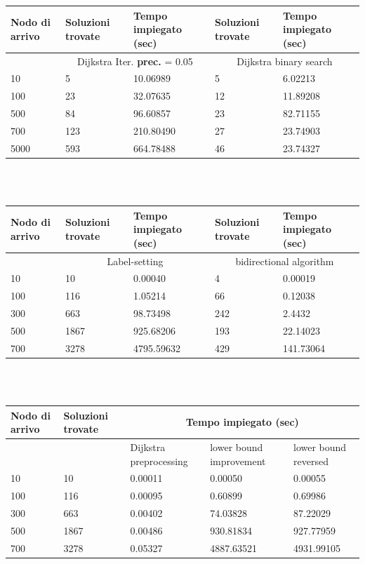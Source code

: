 \documentclass[a4paper,11pt]{report}
\begin{document}
\begin{table}[H]
	\begin{tabular}{ |p{2cm}||p{2cm}|p{3cm}|p{2cm}|p{3cm}|  }
		\hline
		Nodo di arrivo & Soluzioni trovate & Tempo impiegato (sec) & Soluzioni trovate & Tempo impiegato (sec) \\
		\hline
		& \multicolumn{2}{|c|}{Dijkstra Iter. \textbf{prec.} = 0.05} &
		\multicolumn{2}{|c|}{Dijkstra binary search} \\
		\hline
		
		10 & 5 & 10.06989 & 5 & 6.02213\\
		100 & 23 & 32.07635  & 12 & 11.89208\\
		500 & 84 & 96.60857 & 23 & 82.71155\\
		700 & 123 & 210.80490 & 27 & 23.74903\\
		5000 & 593 & 664.78488 & 46 & 23.74327\\	
		\hline
		
	\end{tabular}
	\\
	\\
	
	\begin{tabular}{ |p{2cm}||p{2cm}|p{3cm}|p{2cm}|p{3cm}|  }
		\hline
		Nodo di arrivo & Soluzioni trovate & Tempo impiegato (sec) & Soluzioni trovate & Tempo impiegato (sec) \\
		\hline
		&\multicolumn{2}{|c|}{Label-setting} &  \multicolumn{2}{|c|}{bidirectional algorithm} \\
		\hline
		10 & 10 & 0.00040 & 4 & 0.00019 \\
		100  & 116 & 1.05214 & 66 & 0.12038 \\
		300  & 663 & 98.73498 & 242 & 2.4432 \\
		500 & 1867 & 925.68206 & 193 & 22.14023 \\
		700 & 3278 & 4795.59632 & 429 & 141.73064\\
		
		\hline
		
	\end{tabular}
	\\
	\\
	
	\begin{tabular}{ |p{2cm}||p{2cm}|p{2.5cm}|p{3cm}|p{2.5cm}|  }
		\hline
		Nodo di arrivo & Soluzioni trovate & \multicolumn{3}{|c|}{Tempo impiegato (sec)} \\
		\hline
		& & Dijkstra preprocessing &  lower bound improvement & lower bound reversed \\
		\hline
		10 & 10 & 0.00011 & 0.00050 & 0.00055 \\
		100  & 116 & 0.00095 & 0.60899 & 0.69986 \\
		300  & 663 & 0.00402 & 74.03828 & 87.22029 \\
		500 & 1867 & 0.00486 & 930.81834 & 927.77959 \\
		700 & 3278 & 0.05327& 4887.63521 & 4931.99105\\
		

\end{tabular}
\end{table}
\end{document}
